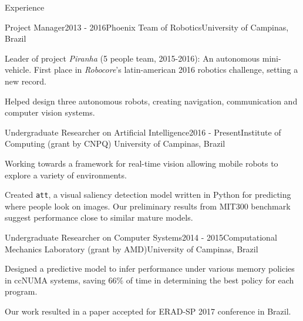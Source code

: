 \documentclass[8pt]{resume}
\newcommand{\tit}[1]{\textit{#1}}
\newcommand{\ttt}[1]{\texttt{#1}}
\begin{document}
\begin{rSection}{Experience}

\begin{rSubsection}{Project Manager}{2013 - 2016}{Phoenix Team of Robotics}{University of Campinas, Brazil}
    \item Leader of project \tit{Piranha} (5 people team, 2015-2016):
        An autonomous mini-vehicle.
        First place in \tit{Robocore}'s latin-american 2016 robotics challenge, setting a new record.
    \item Helped design three autonomous robots, creating navigation,
        communication and computer vision systems.
\end{rSubsection}

\begin{rSubsection}{Undergraduate Researcher on Artificial Intelligence}{2016 - Present}{Institute of Computing (grant by CNPQ)}
    {University of Campinas, Brazil}
    \item Working towards a framework for real-time vision
        allowing mobile robots to explore a variety of environments.
    \item Created \ttt{att}, a visual saliency detection model written in
        Python for predicting where people look on images.
        Our preliminary results from MIT300 benchmark suggest performance
        close to similar mature models.
\end{rSubsection}

\begin{rSubsection}{Undergraduate Researcher on Computer Systems}{2014 - 2015}{Computational Mechanics Laboratory (grant by AMD)}{University of Campinas, Brazil}
    \item Designed a predictive model to infer performance under
        various memory policies in ccNUMA systems, saving $66\%$ of time in
        determining the best policy for each program.
    \item Our work resulted in a paper accepted for ERAD-SP 2017 conference in Brazil.
\end{rSubsection}


\end{rSection}
\end{document}
